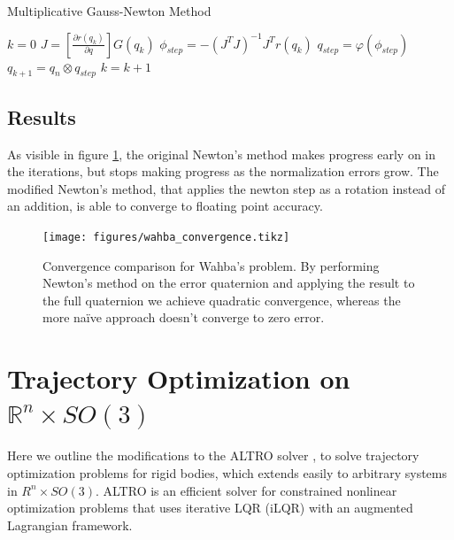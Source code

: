 \documentclass[letterpaper, 10 pt, conference]{ieeeconf}  %
\newcommand{\R}{\mathbb{R}}
\begin{document}
    \begin{algorithm} 
    	\begin{algorithmic}[1]
    		\caption{Multiplicative Gauss-Newton Method}\label{alg:mgn}
    		\State $k = 0$
    		    \State $J = [\frac{\partial r(q_k)}{ \partial q}]G(q_k)$ 
    		    \State $ \phi_{step} = -(J^TJ)^{-1}J^T r(q_k)$ 
    		    \State $q_{step} = \varphi(\phi_{step})$ 
    		    \State $q_{k+1} = q_n \otimes q_{step}$ 
    		    \State $k = k + 1$
    		\EndWhile
    	\end{algorithmic}
    \end{algorithm}



    \subsection{Results}
    
    As visible in figure \ref{fig:wahba_convergence}, the original Newton's method makes progress early on in the iterations, but stops making progress as the normalization errors grow. The modified Newton's method, that applies the newton step as a rotation instead of an addition, is able to converge to floating point accuracy. 
    
    \begin{figure}[H]
        \centering
        \texttt{[image: figures/wahba\_convergence.tikz]}
        \caption{Convergence comparison for Wahba's problem. By performing Newton's method
        on the error quaternion and applying the result to the full quaternion we achieve
        quadratic convergence, whereas the more na\"ive approach doesn't converge to zero
        error.}
        \label{fig:wahba_convergence}
    \end{figure}

\section{Trajectory Optimization on $\R^n \times SO(3)$} \label{sec:trajopt}
    Here we outline the modifications to the ALTRO solver \cite{howell2019altro}, to
    solve trajectory optimization problems for rigid bodies, which extends easily to
    arbitrary systems in $R^n \times SO(3)$. ALTRO is an efficient solver for constrained
    nonlinear optimization problems that uses iterative LQR (iLQR) with an augmented
    Lagrangian framework.
\end{document}
